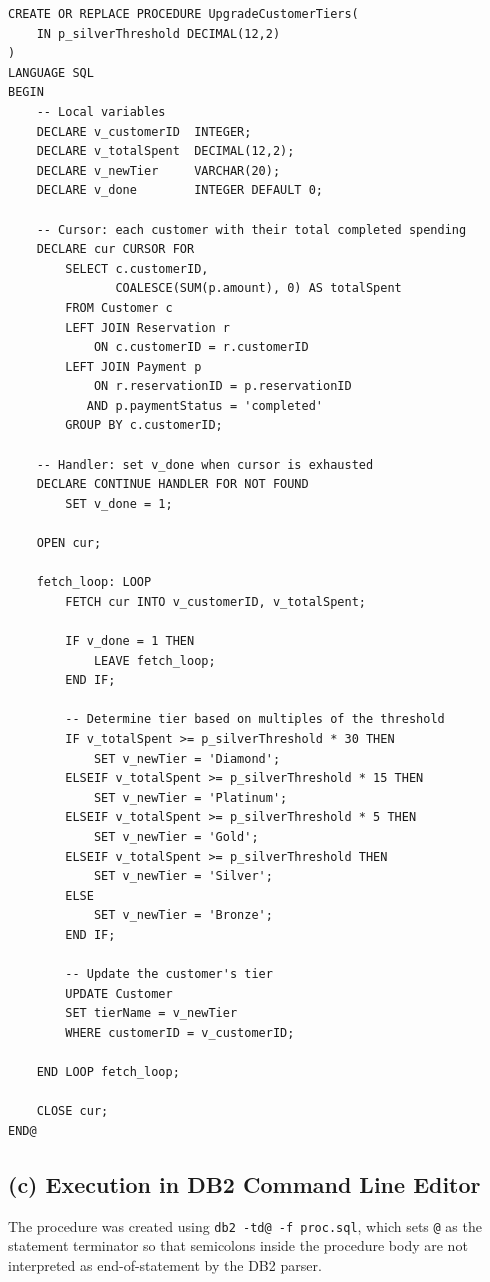 \documentclass[12pt,letterpaper]{article}
\begin{document}
\begin{lstlisting}[style=sqlstyle, caption={Stored Procedure: UpgradeCustomerTiers}]
CREATE OR REPLACE PROCEDURE UpgradeCustomerTiers(
    IN p_silverThreshold DECIMAL(12,2)
)
LANGUAGE SQL
BEGIN
    -- Local variables
    DECLARE v_customerID  INTEGER;
    DECLARE v_totalSpent  DECIMAL(12,2);
    DECLARE v_newTier     VARCHAR(20);
    DECLARE v_done        INTEGER DEFAULT 0;

    -- Cursor: each customer with their total completed spending
    DECLARE cur CURSOR FOR
        SELECT c.customerID,
               COALESCE(SUM(p.amount), 0) AS totalSpent
        FROM Customer c
        LEFT JOIN Reservation r
            ON c.customerID = r.customerID
        LEFT JOIN Payment p
            ON r.reservationID = p.reservationID
           AND p.paymentStatus = 'completed'
        GROUP BY c.customerID;

    -- Handler: set v_done when cursor is exhausted
    DECLARE CONTINUE HANDLER FOR NOT FOUND
        SET v_done = 1;

    OPEN cur;

    fetch_loop: LOOP
        FETCH cur INTO v_customerID, v_totalSpent;

        IF v_done = 1 THEN
            LEAVE fetch_loop;
        END IF;

        -- Determine tier based on multiples of the threshold
        IF v_totalSpent >= p_silverThreshold * 30 THEN
            SET v_newTier = 'Diamond';
        ELSEIF v_totalSpent >= p_silverThreshold * 15 THEN
            SET v_newTier = 'Platinum';
        ELSEIF v_totalSpent >= p_silverThreshold * 5 THEN
            SET v_newTier = 'Gold';
        ELSEIF v_totalSpent >= p_silverThreshold THEN
            SET v_newTier = 'Silver';
        ELSE
            SET v_newTier = 'Bronze';
        END IF;

        -- Update the customer's tier
        UPDATE Customer
        SET tierName = v_newTier
        WHERE customerID = v_customerID;

    END LOOP fetch_loop;

    CLOSE cur;
END@
\end{lstlisting}

\subsection*{(c) Execution in DB2 Command Line Editor}

The procedure was created using \texttt{db2 -td@ -f proc.sql}, which sets \texttt{@} as the statement terminator so that semicolons inside the procedure body are not interpreted as end-of-statement by the DB2 parser.
\end{document}
